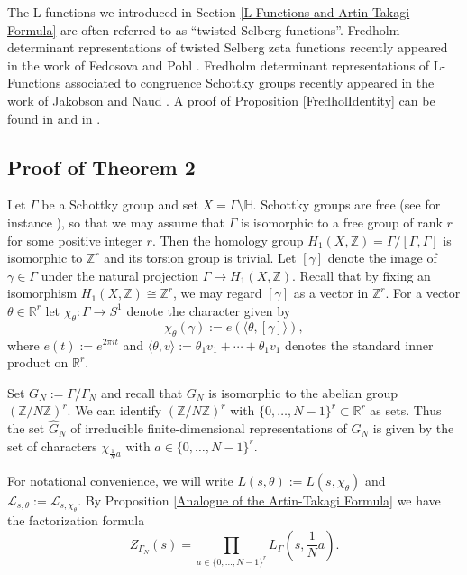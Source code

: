 \documentclass[12pt]{article}
\newcommand{\RR}{\mathbb{R}}
\newcommand{\ZZ}{\mathbb{Z}}
\newcommand{\HH}{\mathbb{H}}
\begin{document}
The L-functions we introduced in Section \ref{L-Functions and Artin-Takagi Formula} are often referred to as ``twisted Selberg functions''. Fredholm determinant representations of twisted Selberg zeta functions recently appeared in the work of Fedosova and Pohl \cite{PF}. Fredholm determinant representations of L-Functions associated to congruence Schottky groups recently appeared in the work of Jakobson and Naud \cite{JN}. A proof of Proposition \ref{FredholIdentity} can be found in \cite{PF} and in \cite{JN}.

\subsection{Proof of Theorem 2} 


Let $ \Gamma $ be a Schottky group and set $ X = \Gamma\setminus \HH  $. Schottky groups are free (see for instance \cite[Lemma~15.2]{Borthwick}), so that we may assume that $ \Gamma $ is isomorphic to a free group of rank $ r $ for some positive integer $ r $. Then the homology group $ H_{1}(X, \ZZ) = \Gamma/[\Gamma, \Gamma] $ is isomorphic to $ \ZZ^{r} $ and its torsion group is trivial. Let $ [\gamma] $ denote the image of $ \gamma\in \Gamma $ under the natural projection $ \Gamma\to H_{1}(X, \ZZ).$ Recall that by fixing an isomorphism $ H_{1}(X, \ZZ) \cong \ZZ^{r} $, we may regard $ [\gamma] $ as a vector in $ \ZZ^{r} $. For a vector $ \theta\in \mathbb{R}^{r} $ let $ \chi_{\theta} :\Gamma\to S^{1} $ denote the character given by
$$ \chi_{\theta}(\gamma) := e(\langle \theta,[\gamma] \rangle), $$ 
where $ e(t) := e^{2\pi i t} $ and $ \langle \theta, v \rangle := \theta_{1}v_{1} + \cdots + \theta_{1}v_{1} $ denotes the standard inner product on $ \mathbb{R}^{r}. $

Set $ G_{N}:= \Gamma/\Gamma_{N}$ and recall that $ G_{N} $ is isomorphic to the abelian group $ (\ZZ/N\ZZ)^{r} $. We can identify $ (\ZZ/N\ZZ)^{r} $ with $ \{ 0, \dots, N-1\}^{r}\subset \RR^{r} $ as sets. Thus the set $ \widehat{G}_{N} $ of irreducible finite-dimensional representations of $ G_{N} $ is given by the set of characters $ \chi_{\frac{1}{N}a} $ with $ a\in \{ 0, \dots, N-1\}^{r}. $ 

For notational convenience, we will write $ L(s,\theta) := L(s, \chi_{\theta}) $ and $ \mathcal{L}_{s, \theta} := \mathcal{L}_{s, \chi_{\theta}}. $ By Proposition \ref{Analogue of the Artin-Takagi Formula} we have the factorization formula
\begin{equation}\label{ArtTak}
 Z_{\Gamma_{N}}(s) = \prod_{a\in \{ 0, \dots, N-1\}^{r}} L_{\Gamma}\left( s, \frac{1}{N}a\right).
\end{equation}
\end{document}
